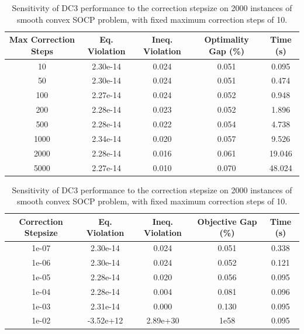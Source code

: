 \documentclass{article}
\begin{document}
\begin{table}[t]
\footnotesize
\centering
\begin{tabular}{ccccc}
\toprule
Max Correction Steps & Eq. Violation & Ineq. Violation & Optimality Gap (\%) & Time (s) \\
\midrule
10 & 2.30e-14 & 0.024 & 0.051 & 0.095 \\
50 & 2.30e-14 & 0.024 & 0.051 & 0.474 \\
100 & 2.27e-14 & 0.024 & 0.052 & 0.948 \\
200 & 2.28e-14 & 0.023 & 0.052 & 1.896 \\
500 & 2.28e-14 & 0.022 & 0.054 & 4.738 \\
1000 & 2.34e-14 & 0.020 & 0.057 & 9.526 \\
2000 & 2.28e-14 & 0.016 & 0.061 & 19.046 \\
5000 & 2.27e-14 & 0.010 & 0.070 & 48.024 \\
\bottomrule
\end{tabular}
\caption{Sensitivity of DC3 performance to the maximum number of correction steps on 2000 instances of smooth convex SOCP problem, with fixed correction stepsize of $10^{-7}$.}
\label{tab: dc3 steps_sensitivity}
\vspace{2em}
\begin{tabular}{ccccc}
\toprule
Correction Stepsize & Eq. Violation & Ineq. Violation & Objective Gap (\%) & Time (s) \\
\midrule
1e-07 & 2.30e-14 & 0.024 & 0.051 & 0.338 \\
1e-06 & 2.30e-14 & 0.024 & 0.052 & 0.121 \\
1e-05 & 2.28e-14 & 0.020 & 0.056 & 0.095 \\
1e-04 & 2.28e-14 & 0.004 & 0.081 & 0.096 \\
1e-03 & 2.31e-14 & 0.000 & 0.130 & 0.095 \\
1e-02 & -3.52e+12 & 2.89e+30 & 1e58 & 0.095 \\
\bottomrule
\end{tabular}
\caption{Sensitivity of DC3 performance to the correction stepsize on 2000 instances of smooth convex SOCP problem, with fixed maximum correction steps of 10.}
\label{tab: dc3 lr_sensitivity}
\end{table}




\clearpage
\end{document}

